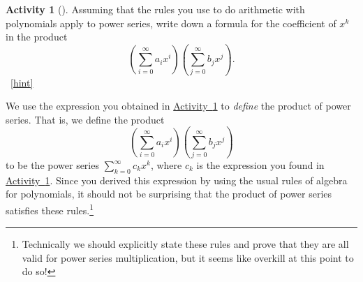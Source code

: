 \documentclass[10pt,]{book}
\theoremstyle{plain}
\theoremstyle{definition}
\theoremstyle{definition}
\theoremstyle{definition}
\newtheorem{activity}[project]{Activity}
\numberwithin{equation}{chapter}
\begin{document}
\begin{activity}[]\label{coeffinpowerseries}
\hypertarget{p-877}{}%
Assuming that the rules you use to do arithmetic with polynomials apply to power series, write down a formula for the coefficient of \(x^k\) in the product%
\begin{equation*}
\left(\sum_{i=0}^\infty a_ix^i\right)\left(\sum_{j=0}^\infty
b_jx^j\right)\text{.}
\end{equation*}
%
~\hfill{\tiny\hyperlink{a-186}{[hint]}\hypertarget{q-186}{}}\end{activity}
\hypertarget{p-880}{}%
We use the expression you obtained in \hyperref[coeffinpowerseries]{Activity~\ref{coeffinpowerseries}} to \emph{define} the product of power series. That is, we define the product%
\begin{equation*}
\left(\sum_{i=0}^\infty a_ix^i\right)\left(\sum_{j=0}^\infty
b_jx^j\right)
\end{equation*}
to be the power series \(\sum_{k=0}^\infty c_k x^k\), where \(c_k\) is the expression you found in \hyperref[coeffinpowerseries]{Activity~\ref{coeffinpowerseries}}. Since you derived this expression by using the usual rules of algebra for polynomials, it should not be surprising that the product of power series satisfies these rules.\footnote{Technically we should explicitly state these rules and prove that they are all valid for power series multiplication, but it seems like overkill at this point to do so!\label{fn-8}}%
\typeout{************************************************}
\typeout{************************************************}
\end{document}
